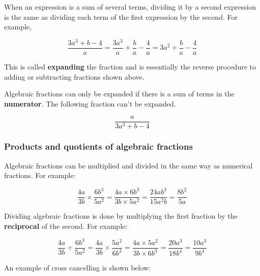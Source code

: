 When an expression is a sum of several terms, dividing it by a second expression is the same as dividing each term of the first expression by the second. For example,

\[ \frac{3a^{3} + b - 4}{a} = \frac{3a^{3}}{a} + \frac{b}{a} - \frac{4}{a} = 3a^{2} + \frac{b}{a} - \frac{4}{a} \]

This is called \textbf{expanding} the fraction and is essentially the reverse procedure to adding or subtracting fractions shown above.

Algebraic fractions can only be expanded if there is a sum of terms in the \textbf{numerator}. The following fraction can't be expanded.

\[
  \frac{a}{3a^{3} + b - 4}
\]

\subsubsection{Products and quotients of algebraic fractions}

Algebraic fractions can be multiplied and divided in the same way as numerical fractions. For example:

\[
  \frac{4a}{3b} \times \frac{6b^{3}}{5a^{2}} = \frac{4a \times 6b^{3}}{3b \times 5a^{2}} = \frac{24ab^{3}}{15a^{2}b} = \frac{8b^{2}}{5a}
\]

Dividing algebraic fractions is done by multiplying the first fraction by the \textbf{reciprocal} of the second. For example:

\[
  \frac{4a}{3b} \div \frac{6b^{3}}{5a^{2}} = \frac{4a}{3b} \times \frac{5a^{2}}{6b^{3}} = \frac{4a \times 5a^{2}}{3b \times 6b^{3}} = \frac{20a^{3}}{18b^{4}} = \frac{10a^{3}}{9b^{4}}
\]


An example of cross cancelling is shown below:

